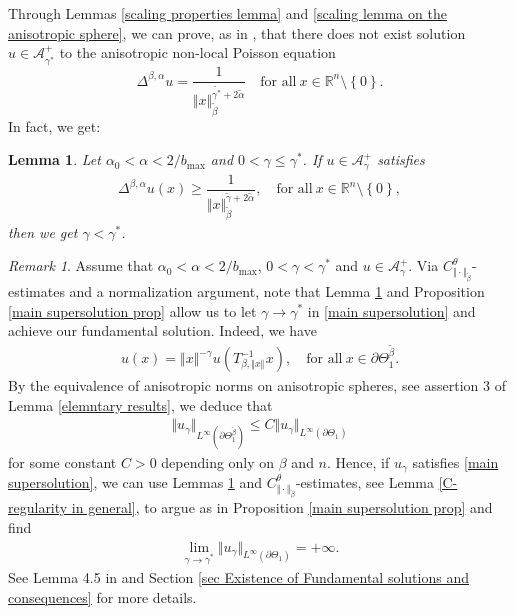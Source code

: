 \documentclass[10pt, leqno]{article}
\newtheorem{lemma}[theorem]{Lemma}
\theoremstyle{definition}
\theoremstyle{remark}
\newtheorem{remark}[theorem]{Remark}
\numberwithin{equation}{section}
\begin{document}
Through Lemmas \ref{scaling properties lemma} and \ref{scaling lemma on the anisotropic sphere}, we can prove, as in \cite{CWW}, that there does not exist solution $u \in \mathcal{A}^{+}_{\gamma^{\ast}}$ to the anisotropic non-local Poisson equation
$$
\Delta^{\beta, \alpha} u = \dfrac{1}{\Vert x \Vert_{\tilde{\beta}}^{\tilde{\gamma^{\ast}} + 2 \tilde{\alpha}}} \quad \text{for all} \ x \in \mathbb{R}^{n} \setminus \left\lbrace 0 \right\rbrace.
$$
In fact, we get:
\begin{lemma}
\label{barrier lemma lemma 2}
Let $ \alpha_{0} < \alpha < 2/b_{\max}$ and $0 < \gamma \leq \gamma^{\ast}$. If $u \in \mathcal{A}_{\gamma}^{+}$ satisfies
\begin{eqnarray}
\label{Poisson equation fails}
\Delta^{\beta, \alpha} u (x) \geq \dfrac{1}{\Vert x \Vert_{\tilde{\beta}}^{\tilde{\gamma} + 2\tilde{\alpha}}}, \quad \text{for all} \ x \in \mathbb{R}^{n} \setminus \left\lbrace 0 \right\rbrace,
\end{eqnarray}
then we get $\gamma < \gamma^{\ast}$.
\end{lemma}


\begin{remark}
\label{conseq. of main supersolution}
Assume that $ \alpha_{0} < \alpha < 2/b_{\max}$, $0 < \gamma < \gamma^{\ast}$ and $u \in \mathcal{A}^{+}_{\gamma}$. Via $C^{\theta}_{\Vert \cdot \Vert_{\tilde{\beta}}}$-estimates and a normalization argument, note that Lemma \ref{barrier lemma lemma 2} and Proposition \ref{main supersolution prop} allow us to let $\gamma \rightarrow \gamma^{\ast}$ in \eqref{main supersolution} and achieve our fundamental solution. Indeed, we have
\begin{eqnarray}
u(x) = \Vert x \Vert^{- \gamma} u \left( T^{-1}_{\beta, \Vert x \Vert_{}}x\right), \quad \text{for all} \ x \in \partial\Theta^{\tilde{\beta}}_{1}.
\end{eqnarray}
By the equivalence of anisotropic norms on anisotropic spheres, see assertion 3 of Lemma \ref{elemntary results}, we deduce that
\begin{eqnarray}
\Vert u_{\gamma} \Vert_{L^{\infty}\left(\partial \Theta^{\tilde{\beta}}_{1} \right)} \leq C \Vert u_{\gamma} \Vert_{L^{\infty}(\partial \Theta_{1})}
\end{eqnarray}
for some constant $C>0$ depending only on $\beta$ and $n$. Hence, if $u_{\gamma}$
satisfies \eqref{main supersolution}, we can use Lemmas \ref{barrier lemma lemma 2} and $C^{\theta}_{\Vert \cdot \Vert_{\tilde{\beta}}}$-estimates, see Lemma \ref{C-regularity in general}, to argue as in Proposition \ref{main supersolution prop} and find
\begin{eqnarray}
\label{conseq. of main supersolution 1}
\lim_{\gamma \rightarrow \gamma^{\ast}}\Vert u_{\gamma} \Vert_{L^{\infty}(\partial \Theta_{1})} = +\infty.
\end{eqnarray}
See Lemma 4.5 in \cite{CWW} and Section \ref{sec Existence of Fundamental solutions and consequences} for more details.
\end{remark}
\end{document}
